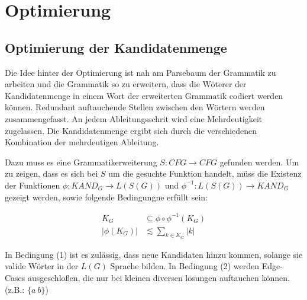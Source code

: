 \documentclass[]{article}
\begin{document}
% 

% 





\section{Optimierung}

\subsection{Optimierung der Kandidatenmenge}
Die Idee hinter der Optimierung ist nah am Parsebaum der Grammatik zu arbeiten und die Grammatik so zu erweitern, dass die Wöterer der Kandidatenmenge in einem Wort der erweiterten Grammatik codiert werden können. Redundant auftauchende Stellen zwischen den Wörtern werden zusammengefasst. An jedem Ableitungsschrit wird eine Mehrdeutigkeit zugelassen. Die Kandidatenmenge ergibt sich durch die verschiedenen Kombination der mehrdeutigen Ableitung.

Dazu muss es eine Grammatikerweiterung $S: CFG \rightarrow CFG$ gefunden werden.
Um zu zeigen, dass es sich bei $S$ um die gesuchte Funktion handelt, müss die Existenz der Funktionen $\phi: KAND_G \rightarrow L(S(G))$ und $\phi^{-1}: L(S(G)) \rightarrow KAND_G$ gezeigt werden, sowie folgende Bedingungne erfüllt sein:

\begin{align}
 K_G &\subseteq \phi\circ\phi^{-1}(K_G) \\
 |\phi(K_G)| &\lesssim \sum_{k\in K_G} |k|
\end{align}

In Bedingung (1) ist es zulässig, dass neue Kandidaten hinzu kommen, solange sie valide Wörter in der $L(G)$ Sprache bilden. 
In Bedingung (2) werden Edge-Cases ausgeschloßen, die nur bei kleinen diversen lösungen auftauchen können. (z.B.: $\{a\ b\}$)
\end{document}
